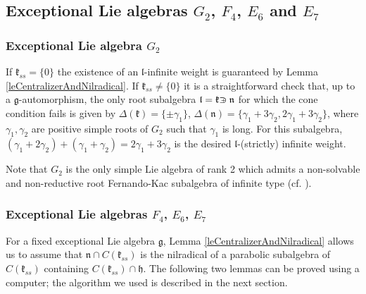 \documentclass[12pt]{report}
\newcommand{\kk}{\mathfrak{k}}
\newcommand{\nn}{\mathfrak{n}}
\newcommand{\hh}{\mathfrak{h}}
\newcommand{\gG}{\mathfrak{g}}
\newcommand{\lL}{\mathfrak{l}}
\newcommand{\refle}[1]{Lemma \ref{#1}}
\def\crplus{\hbox{$\supset${\raise1.05pt\hbox{\kern -0.60em ${\scriptscriptstyle +}$}}\ }}
\begin{document}
\subsection{Exceptional Lie algebras $G_2$, $F_4$, $E_6$ and $E_7$}
\subsubsection{Exceptional Lie algebra $G_2$}
If $\kk_{ss}=\{0\}$ the existence of an $\lL$-infinite weight is guaranteed by \refle{leCentralizerAndNilradical}. If $\kk_{ss} \neq \{0\}$ it is a straightforward check that, up to a $\gG$-automorphism, the only root subalgebra $\lL=\kk\crplus\nn$ for which the cone condition fails is given by $\Delta(\kk)=\{\pm\gamma_1\}$, $\Delta(\nn)=\{\gamma_1+3\gamma_2, 2\gamma_1+3\gamma_2\}$, where $\gamma_1, \gamma_2$ are positive simple roots of $G_2$ such that $\gamma_1$ is long. For this subalgebra, $(\gamma_1+2\gamma_2)+(\gamma_1+\gamma_2)=2\gamma_1+3\gamma_2$ is the desired $\lL$-(strictly) infinite weight.

Note that $G_2$ is the only simple Lie algebra of rank 2 which admits a non-solvable and non-reductive root Fernando-Kac subalgebra of infinite type (cf. \cite[Example 2]{PS:GenHarishChandra}).

\subsubsection{Exceptional Lie algebras $F_4$, $E_6$, $E_7$}\label{secExceptional}
For a fixed exceptional Lie algebra $\gG$, \refle{leCentralizerAndNilradical} allows us to assume that $\nn\cap C(\kk_{ss})$ is the nilradical of a parabolic subalgebra of $C(\kk_{ss})$ containing $C(\kk_{ss})\cap \hh$. 
The following two lemmas can be proved using a computer; the algorithm we used is described in the next section.
\end{document}
